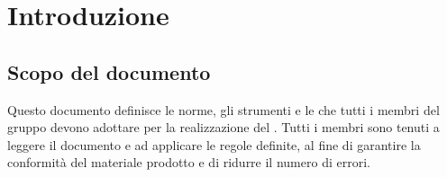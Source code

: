 \section{Introduzione}

\subsection{Scopo del documento}
Questo documento definisce le norme, gli strumenti e le  che tutti i membri del gruppo devono adottare per la realizzazione del . Tutti i membri sono tenuti a leggere il documento e ad applicare le regole definite, al fine di garantire la conformit\`a del materiale prodotto e di ridurre il numero di errori.
